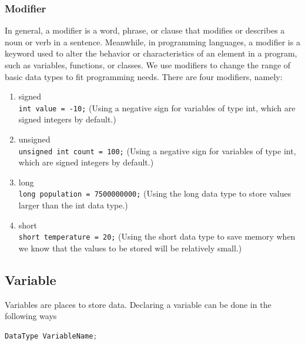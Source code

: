 \subsubsection{Modifier}
In general, a modifier is a word, phrase, or clause that modifies or describes a noun or verb in a sentence. Meanwhile, in programming languages, a modifier is a keyword used to alter the behavior or characteristics of an element in a program, such as variables, functions, or classes. We use modifiers to change the range of basic data types to fit programming needs. There are four modifiers, namely:
\begin{enumerate}
	\item signed \\
	\verb|int value = -10;| (Using a negative sign for variables of type int, which are signed integers by default.)
	\item unsigned \\
	\verb|unsigned int count = 100;|  (Using a negative sign for variables of type int, which are signed integers by default.)
	\item long \\ 
	\verb|long population = 7500000000;| (Using the long data type to store values larger than the int data type.)
	\item short \\
	\verb|short temperature = 20;| (Using the short data type to save memory when we know that the values to be stored will be relatively small.)
\end{enumerate}


\subsection{Variable}
Variables are places to store data. Declaring a variable can be done in the following ways
\begin{lstlisting}[language=c,caption=C variable declaration,label=lst:deklarasivariabel,captionpos=t]
DataType VariableName;
\end{lstlisting}

